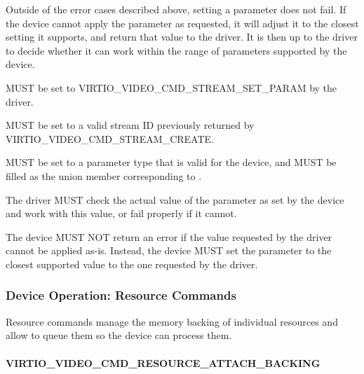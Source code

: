 Outside of the error cases described above, setting a parameter does not
fail. If the device cannot apply the parameter as requested, it will
adjust it to the closest setting it supports, and return that value to
the driver. It is then up to the driver to decide whether it can work
within the range of parameters supported by the device.


 MUST be set to VIRTIO\_VIDEO\_CMD\_STREAM\_SET\_PARAM
by the driver.

 MUST be set to a valid stream ID previously returned
by VIRTIO\_VIDEO\_CMD\_STREAM\_CREATE.

 MUST be set to a parameter type that is valid for the
device, and  MUST be filled as the union member
corresponding to .

The driver MUST check the actual value of the parameter as set by the
device and work with this value, or fail properly if it cannot.


The device MUST NOT return an error if the value requested by the driver
cannot be applied as-is. Instead, the device MUST set the parameter to
the closest supported value to the one requested by the driver.

\subsubsection{Device Operation: Resource Commands}\label{sec:Device Types / Video Device / Device Operation / Device Operation: Resource Commands}

Resource commands manage the memory backing of individual resources and
allow to queue them so the device can process them.

\paragraph{VIRTIO_VIDEO_CMD_RESOURCE_ATTACH_BACKING}\label{sec:Device Types / Video Device / Device Operation / Device Operation: Resource Commands / VIRTIO_VIDEO_CMD_RESOURCE_ATTACH_BACKING}

